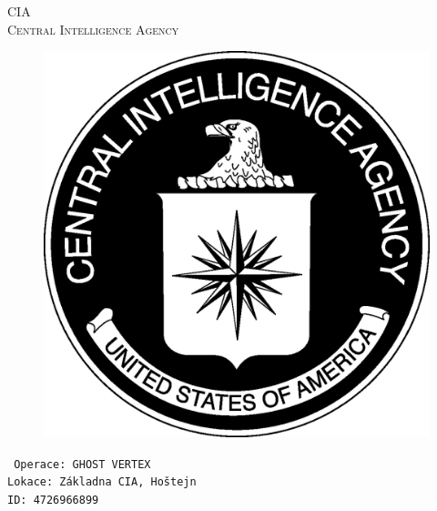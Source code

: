 \documentclass[a4paper, \fontheight]{article}
\begin{document}
	\begin{titlepage}
		\begin{center}		
			\textsc{{\fontsize{80}{0}\selectfont CIA}\\[2em]
				\Huge Central Intelligence Agency\\[2.5em]}
				
			\begin{figure}[H]
				\centering
				\includegraphics[scale=0.6]{sources/CIA_logo.eps}
			\end{figure}
		\end{center}	
		\vfill
		\noindent
		\texttt{\LARGE
				Operace: GHOST VERTEX\\[0.4em]
				Lokace: Základna CIA, Hoštejn\\[0.4em]
				ID: 4726966899}	
\end{titlepage} 
\end{document}

